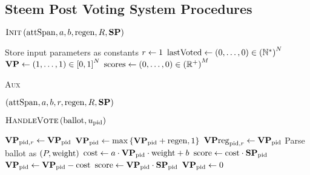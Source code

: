 \documentclass[a4paper,english,cleveref, autoref]{oasics-v2019}
\begin{document}
\begin{subappendices}
\section{Steem Post Voting System Procedures}
  \label{appendix:procs}
\begin{algorithm}[H]
  \caption{$\textsc{Init}\left( \mathrm{attSpan}, a, b, \mathrm{regen}, R,
  \mathrm{\textbf{SP}}\right)$}
  \label{alg:steem:init}
  \begin{algorithmic}[1]
    \State Store input parameters as constants
    \State $r \gets 1$
    \State $\mathrm{lastVoted} \gets \left(0, \dots, 0\right) \in
    \left(\mathbb{N}^*\right)^N$
    \State $\mathrm{\textbf{VP}} \gets \left(1, \dots, 1\right) \in \left[0,
    1\right]^N$
    \label{alg:steem:init:vp}
    \State $\mathrm{scores} \gets \left(0, \dots, 0\right) \in
    \left(\mathbb{R}^{+}\right)^M$
  \end{algorithmic}
\end{algorithm}
\begin{algorithm}[H]
  \caption{\textsc{Aux}}
  \label{alg:steem:aux}
  \begin{algorithmic}[1]
    \State \Return $\left(\mathrm{attSpan}, a, b, r, \mathrm{regen}, R,
    \mathrm{\textbf{SP}}\right)$
  \end{algorithmic}
\end{algorithm}
\begin{algorithm}[H]
  \caption{$\textsc{HandleVote}\left(\mathrm{ballot},
  u_{\mathrm{pid}}\right)$}
  \label{alg:steem:handlevote}
  \begin{algorithmic}[1]
     
      \State $\mathrm{\textbf{VP}}_{\mathrm{pid}, r} \gets \mathrm{\textbf{VP}}_{\mathrm{pid}}$ 
      \State $\mathrm{\textbf{VP}}_{\mathrm{pid}} \gets \max{\lbrace \mathrm{\textbf{VP}}_{\mathrm{pid}} + \mathrm{regen}, 1
      \rbrace}$
      \State $\mathrm{\textbf{VP}reg}_{\mathrm{pid}, r} \gets \mathrm{\textbf{VP}}_{\mathrm{pid}}$ 
      \label{alg:steem:handlevote:regen}
        \State Parse ballot as $\left(P, \mathrm{weight}\right)$
        \State $\mathrm{cost} \gets a \cdot \mathrm{\textbf{VP}}_{\mathrm{pid}} \cdot
        \mathrm{weight} + b$
        \label{alg:steem:handlevote:cost:start}
          \State $\mathrm{score} \gets \mathrm{cost} \cdot \mathrm{\textbf{SP}}_{\mathrm{pid}}$
          \State $\mathrm{\textbf{VP}}_{\mathrm{pid}} \gets \mathrm{\textbf{VP}}_{\mathrm{pid}} - \mathrm{cost}$
        \Else
          \State $\mathrm{score} \gets \mathrm{\textbf{VP}}_{\mathrm{pid}} \cdot
          \mathrm{\textbf{SP}}_{\mathrm{pid}}$
          \State $\mathrm{\textbf{VP}}_{\mathrm{pid}} \gets 0$

\end{algorithmic}
\end{algorithm}
\end{subappendices}
\end{document}
